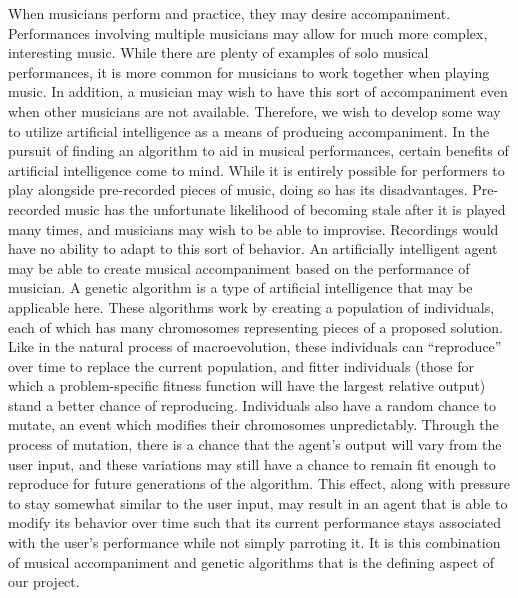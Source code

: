 \documentclass[conference]{IEEEtran}
\begin{document}
When musicians perform and practice, they may desire accompaniment. Performances involving multiple musicians may allow for much more complex, interesting music. While there are plenty of examples of solo musical performances, it is more common for musicians to work together when playing music. In addition, a musician may wish to have this sort of accompaniment even when other musicians are not available. Therefore, we wish to develop some way to utilize artificial intelligence as a means of producing accompaniment.  In the pursuit of finding an algorithm to aid in musical performances, certain benefits of artificial intelligence come to mind. While it is entirely possible for performers to play alongside pre-recorded pieces of music, doing so has its disadvantages. Pre-recorded music has the unfortunate likelihood of becoming stale after it is played many times, and musicians may wish to be able to improvise. Recordings would have no ability to adapt to this sort of behavior. 
An artificially intelligent agent may be able to create musical accompaniment based on the performance of musician.  A genetic algorithm is a type of artificial intelligence that may be applicable here. These algorithms work by creating a population of individuals, each of which has many chromosomes representing pieces of a proposed solution. Like in the natural process of macroevolution, these individuals can “reproduce” over time to replace the current population, and fitter individuals (those for which a problem-specific fitness function will have the largest relative output) stand a better chance of reproducing.  Individuals also have a random chance to mutate, an event which modifies their chromosomes unpredictably. Through the process of mutation, there is a chance that the agent’s output will vary from the user input, and these variations may still have a chance to remain fit enough to reproduce for future generations of the algorithm. This effect, along with pressure to stay somewhat similar to the user input, may result in an agent that is able to modify its behavior over time such that its current performance stays associated with the user’s performance while not simply parroting it.  It is this combination of musical accompaniment and genetic algorithms that is the defining aspect of our project. 
\end{document}
